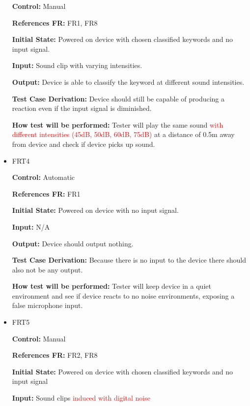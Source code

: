 \documentclass[12pt, titlepage]{article}
\begin{document}
\begin{itemize}
\textbf{Control:} Manual

\textbf{References FR:} FR1, FR8					

\textbf{Initial State:} Powered on device with chosen classified keywords and no input signal. 
					
\textbf{Input:} Sound clip with varying intensities. 
					
\textbf{Output:} Device is able to classify the keyword at different sound intensities. 

\textbf{Test Case Derivation:} Device should still be capable of producing a reaction even if the input signal is diminished.
					
\textbf{How test will be performed:}  Tester will play the same sound \textcolor{red}{with different intensities (45dB, 50dB, 60dB, 75dB)} at a distance of 0.5m away from device and check if device picks up sound.


\item{FRT4}

\textbf{Control:} Automatic

\textbf{References FR:} FR1 					

\textbf{Initial State:} Powered on device with no input signal. 
					
\textbf{Input:} N/A
					
\textbf{Output:} Device should output nothing.

\textbf{Test Case Derivation:} Because there is no input to the device there should also not be any output.
					
\textbf{How test will be performed:} Tester will keep device in a quiet environment and see if device reacts to no noise environments, exposing a false microphone input. 


\item{FRT5}

\textbf{Control:} Manual

\textbf{References FR:} FR2, FR8 					

\textbf{Initial State:} Powered on device with chosen classified keywords and no input signal 
					
\textbf{Input:} Sound clips \textcolor{red}{induced with digital noise}
					

\end{itemize}
\end{document}

